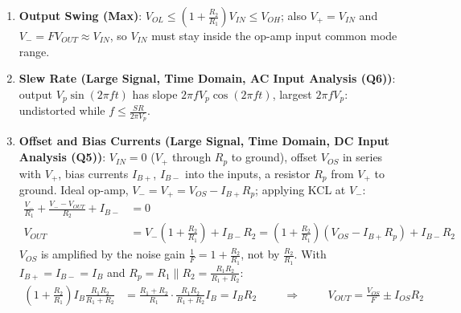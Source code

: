 \begin{enumerate}
    \paragraph{At Output:} \(V_{in} = 0\), test voltage \(V_{test}\) at the output,
    \(V_- = F V_{test}\) (\(R_1 + R_2 \gg R_o\)), internal source \(A(0 - F V_{test})\)
    behind \(R_o\):
    \begin{align*}
      I_{test} &= \frac{V_{test} - (-AF V_{test})}{R_o} = \frac{V_{test}(1 + AF)}{R_o} \hspace{1cm} \Rightarrow \hspace{1cm} Z_{out} = \frac{R_o}{1 + AF}
    \end{align*}
  \item \textbf{Output Swing (Max)}: \(V_{OL} \leq \left(1 + \frac{R_2}{R_1}\right) V_{IN} \leq V_{OH}\);
    also \(V_+ = V_{IN}\) and \(V_- = F V_{OUT} \approx V_{IN}\), so \(V_{IN}\) must stay inside the
    op-amp input common mode range.
  \item \textbf{Slew Rate (Large Signal, Time Domain, AC Input Analysis (Q6))}: output
    \(V_p \sin(2\pi f t)\) has slope \(2\pi f V_p \cos(2\pi f t)\), largest \(2\pi f V_p\):
    undistorted while \(f \leq \frac{SR}{2\pi V_p}\).
  \item \textbf{Offset and Bias Currents (Large Signal, Time Domain, DC Input Analysis (Q5))}: \(V_{IN} = 0\) (\(V_+\) through \(R_p\) to ground),
    offset \(V_{OS}\) in series with \(V_+\), bias currents \(I_{B+}\), \(I_{B-}\) into the inputs, a resistor \(R_p\) from
    \(V_+\) to ground. Ideal op-amp, \(V_- = V_+ = V_{OS} - I_{B+} R_p\); applying KCL at \(V_-\):
    \begin{align*}
      \frac{V_-}{R_1} + \frac{V_- - V_{OUT}}{R_2} + I_{B-} &= 0 \\
      V_{OUT} &= V_-\left(1 + \frac{R_2}{R_1}\right) + I_{B-} R_2 = \left(1 + \frac{R_2}{R_1}\right)(V_{OS} - I_{B+} R_p) + I_{B-} R_2
    \end{align*}
    \(V_{OS}\) is amplified by the noise gain \(\frac{1}{F} = 1 + \frac{R_2}{R_1}\), not by \(\frac{R_2}{R_1}\). With
    \(I_{B+} = I_{B-} = I_B\) and \(R_p = R_1 \parallel R_2 = \frac{R_1 R_2}{R_1 + R_2}\):
    \begin{align*}
      \left(1 + \frac{R_2}{R_1}\right) I_B \frac{R_1 R_2}{R_1 + R_2} &= \frac{R_1 + R_2}{R_1}\cdot\frac{R_1 R_2}{R_1 + R_2} I_B = I_B R_2 \hspace{1cm} \Rightarrow \hspace{1cm} V_{OUT} = \frac{V_{OS}}{F} \pm I_{OS} R_2
    \end{align*}

\end{enumerate}

